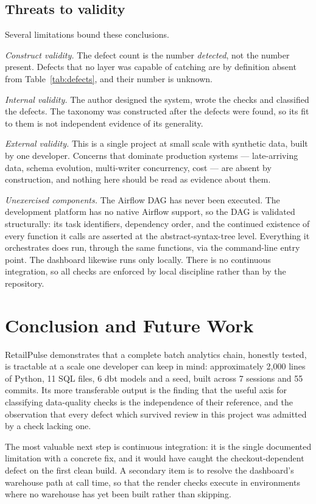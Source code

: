 \documentclass[conference]{IEEEtran}
\begin{document}
\subsection{Threats to validity}
Several limitations bound these conclusions.

\emph{Construct validity.} The defect count is the number \emph{detected}, not
the number present. Defects that no layer was capable of catching are by
definition absent from Table~\ref{tab:defects}, and their number is unknown.

\emph{Internal validity.} The author designed the system, wrote the checks and
classified the defects. The taxonomy was constructed after the defects were
found, so its fit to them is not independent evidence of its generality.

\emph{External validity.} This is a single project at small scale with
synthetic data, built by one developer. Concerns that dominate production
systems --- late-arriving data, schema evolution, multi-writer concurrency,
cost --- are absent by construction, and nothing here should be read as
evidence about them.

\emph{Unexercised components.} The Airflow DAG has never been executed. The
development platform has no native Airflow support, so the DAG is validated
structurally: its task identifiers, dependency order, and the continued
existence of every function it calls are asserted at the abstract-syntax-tree
level. Everything it orchestrates does run, through the same functions, via the
command-line entry point. The dashboard likewise runs only locally. There is no
continuous integration, so all checks are enforced by local discipline rather
than by the repository.

\section{Conclusion and Future Work}
\label{sec:conclusion}

RetailPulse demonstrates that a complete batch analytics chain, honestly
tested, is tractable at a scale one developer can keep in mind: approximately
2{,}000 lines of Python, 11 SQL files, 6 dbt models and a seed, built across 7
sessions and 55 commits. Its more transferable output is the finding that the
useful axis for classifying data-quality checks is the independence of their
reference, and the observation that every defect which survived review in this
project was admitted by a check lacking one.

The most valuable next step is continuous integration: it is the single
documented limitation with a concrete fix, and it would have caught the
checkout-dependent defect on the first clean build. A secondary item is to
resolve the dashboard's warehouse path at call time, so that the render checks
execute in environments where no warehouse has yet been built rather than
skipping.
\end{document}

